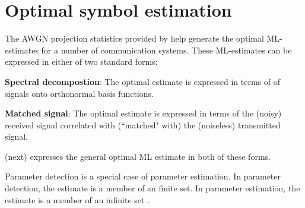 \section{Optimal symbol estimation}
\label{sec:awgn_est}
The AWGN projection statistics provided by
 help generate the optimal
ML-estimates for a number of communication systems.
These ML-estimates can be expressed in either of two standard forms:
\begin{liste}
  \item {\bf Spectral decompostion}:
     The optimal estimate is expressed in terms of 
     of signals onto orthonormal basis functions.
  \item {\bf Matched signal}:
     The optimal estimate is expressed in terms of the (noisy)
     received signal correlated with (``matched" with)
     the (noiseless) transmitted signal.
\end{liste}
 (next) expresses the general
optimal ML estimate in both of these forms.

Parameter detection is a special case of parameter estimation.
In parameter detection, the estimate is a member of an finite set.
In parameter estimation, the estimate is a member of an infinite set
.


